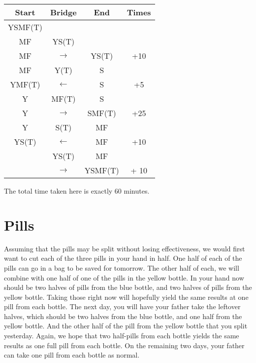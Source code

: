 \documentclass[12pt]{article}
\begin{document}
\begin{center}
    \begin{tabular}{|c|c|c|c|}
        \hline
        \rowcolor[RGB]{200, 200, 200}
        Start & Bridge & End & Times\\
        \hline
        YSMF(T) & & & \\
        \hline
        \rowcolor[RGB]{220, 220, 220}
        MF & YS(T) & & \\
        \rowcolor[RGB]{220, 220, 220}
        MF & $\longrightarrow$ & YS(T) & +10\\
        \hline
        MF & Y(T) & S & \\
        YMF(T) & $\longleftarrow$ & S & +5\\
        \hline
        \rowcolor[RGB]{220, 220, 220}
        Y & MF(T) & S & \\
        \rowcolor[RGB]{220, 220, 220}
        Y & $\longrightarrow$ & SMF(T) & +25\\
        \hline
        Y & S(T) & MF & \\
        YS(T) & $\longleftarrow$ & MF & +10\\
        \hline
        \rowcolor[RGB]{220, 220, 220}
        & YS(T) & MF & \\
        \rowcolor[RGB]{220, 220, 220}
        & $\longrightarrow$ & YSMF(T) &+ 10\\
        \hline
    \end{tabular}
\end{center}

The total time taken here is exactly 60 minutes.

\newpage
\section*{Pills}
Assuming that the pills may be split without losing effectiveness, we would first want to cut each of the three pills in your hand in half. One half of each of the pills can go in a bag to be saved for tomorrow. The other half of each, we will combine with one half of one of the pills in the yellow bottle. In your hand now should be two halves of pills from the blue bottle, and two halves of pills from the yellow bottle. Taking those right now will hopefully yield the same results at one pill from each bottle. The next day, you will have your father take the leftover halves, which should be two halves from the blue bottle, and one half from the yellow bottle. And the other half of the pill from the yellow bottle that you split yesterday. Again, we hope that two half-pills from each bottle yields the same results as one full pill from each bottle. On the remaining two days, your father can take one pill from each bottle as normal.
\end{document}
